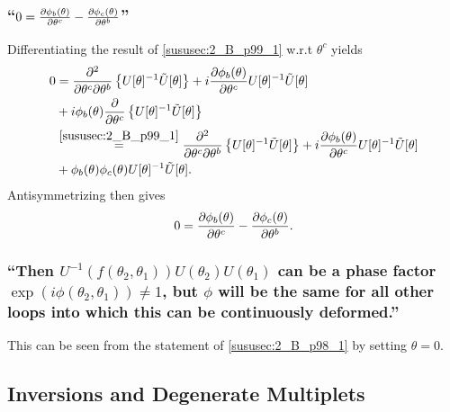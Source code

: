 \subsubsection{\enquote{$0=\partialderivative{\phi_b(\theta)}{\theta^c}-\partialderivative{\phi_c(\theta)}{\theta^b}$} }
Differentiating the result of \ref{sususec:2_B_p99_1} w.r.t $\theta ^c$ yields
\begin{align*} 
	0&=\partialderivative{^2}{\theta^c\partial\theta^b}\left\{U[\theta]^{-1}\tilde{U}[\theta]\right\}+i\partialderivative{\phi_b(\theta)}{\theta^c} U[\theta]^{-1} \tilde{U}[\theta]\\
	&+i\phi_b(\theta)\partialderivative{}{\theta^c}\left\{U[\theta]^{-1}\tilde{U}[\theta]\right\}\\
	&\overset{\ref{sususec:2_B_p99_1}}{=}\partialderivative{^2}{\theta^c\partial\theta^b}\left\{U[\theta]^{-1}\tilde{U}[\theta]\right\}+i\partialderivative{\phi_b(\theta)}{\theta^c} U[\theta]^{-1} \tilde{U}[\theta]\\
	&+\phi_b(\theta)\phi_c(\theta) U[\theta]^{-1} \tilde{U}[\theta].
\end{align*}
Antisymmetrizing then gives 
\[0=\partialderivative{\phi_b(\theta)}{\theta^c}-\partialderivative{\phi_c(\theta)}{\theta^b}.\]

\subsubsection{\enquote{Then $U^{-1}(f(\theta_2,\theta_1))U(\theta_2)U(\theta_1)$ can be a phase factor $\exp(i\phi(\theta_2,\theta_1))\neq 1$, but $\phi$ will be the same for all other loops into which this can be continuously deformed.} }
This can be seen from the statement of \ref{sususec:2_B_p98_1} by setting $\theta =0$.



\subsection{Inversions and Degenerate Multiplets}\label{susec:2_C}
